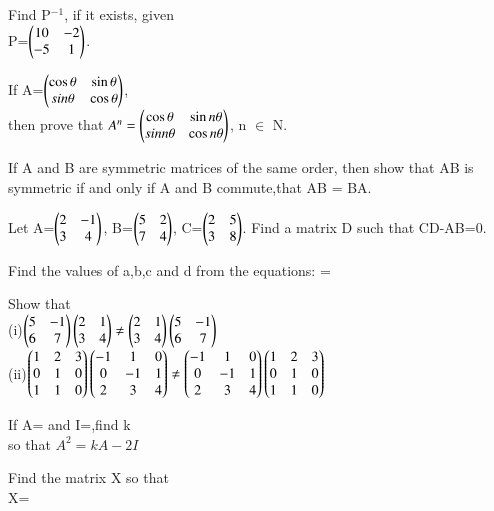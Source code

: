 \item Find P$^{-1}$, if it exists, given \\
P=$\begin{pmatrix}10 &-2\\-5 &1\end{pmatrix}$.\\
\item If A=$\begin{pmatrix}\cos\theta &\sin\theta\\ \-sin\theta &\cos\theta\end{pmatrix}$,\\then prove that $A^{n}=\begin{pmatrix}\cos\theta &\sin n\theta\\\-sin n\theta &\cos n\theta\end{pmatrix}$, n $\in$ N.\\
\item If A and B are symmetric matrices of the same order, then show that AB is symmetric if and only if A and B commute,that AB = BA.\\
\item Let A=$\begin{pmatrix}2 &-1\\3 &4\end{pmatrix}$, B=$\begin{pmatrix}5 &2\\7 &4\end{pmatrix}$, C=$\begin{pmatrix}2 &5\\3 &8\end{pmatrix}$. Find a matrix D such that CD-AB=0. 
\item Find the values of a,b,c and d from the equations:  = 
\item Show that\\
(i)$\begin{pmatrix}5 &-1\\6 &7\end{pmatrix}\begin{pmatrix}2 &1\\3 &4\end{pmatrix}\neq\begin{pmatrix}2 &1\\3 &4\end{pmatrix}\begin{pmatrix}5 &-1\\6 &7\end{pmatrix}$
\\
(ii)$\begin{pmatrix}1 &2 &3\\0 &1 &0\\1 &1 &0\end{pmatrix}\begin{pmatrix}-1 &1 &0\\0 &-1 &1\\2 &3 &4\end{pmatrix}\neq \begin{pmatrix}-1 &1 &0\\0 &-1 &1\\2 &3 &4\end{pmatrix}\begin{pmatrix}1 &2 &3\\0 &1 &0\\1 &1 &0\end{pmatrix}$\\
\item If A= and I=,find k\\
 so that $A^2=kA-2I$\\
  \item Find the matrix X so that\\ X=\\

